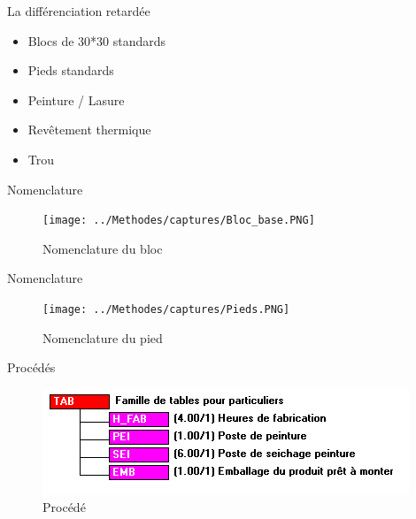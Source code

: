 
\begin{frame}{La différenciation retardée}
\begin{itemize}
\item<1-> Blocs de 30*30 standards 
\item<2-> Pieds standards
\item<3-> Peinture / Lasure
\item<4-> Revêtement thermique
\item<5-> Trou 
\end{itemize}
\end{frame}

\begin{frame}{Nomenclature}
	\begin{figure}[H]
\centering
\texttt{[image: ../Methodes/captures/Bloc\_base.PNG]}
\caption{Nomenclature du bloc}
	\end{figure}		
\end{frame}

\begin{frame}{Nomenclature}
	\begin{figure}[H]
\centering
\texttt{[image: ../Methodes/captures/Pieds.PNG]}
\caption{Nomenclature du pied}
	\end{figure}		
\end{frame}

\begin{frame}{Procédés}
	\begin{figure}[H]
\centering
\includegraphics[scale=0.4]{../Methodes/captures/procede_fab_table_particulier.PNG}
\caption{Procédé}
	\end{figure}		
\end{frame}
